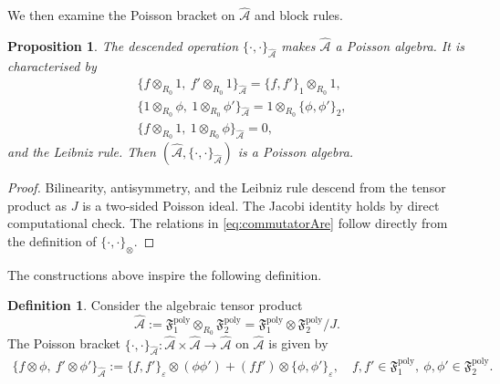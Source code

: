 \documentclass[11pt]{amsart}
\newtheorem{proposition}[theorem]{Proposition}
\theoremstyle{definition}
\newtheorem{definition}[theorem]{Definition}
\theoremstyle{plain}
\theoremstyle{conclusion}
\begin{document}
We then examine the Poisson bracket on $\widehat{\mathcal{A}}$ and block rules.

\begin{proposition} 
The descended operation $\{\cdot,\cdot\}_{\widehat{\mathcal{A}}}$ makes $\widehat{\mathcal{A}}$ a Poisson algebra. It is characterised by
\begin{align}
\nonumber
&\{f\otimes_{R_0} 1,\ f'\otimes_{R_0} 1\}_{\widehat{\mathcal{A}}} =\{f,f'\}_1\otimes_{R_0} 1,\\
&\{1\otimes_{R_0} \phi,\ 1\otimes_{R_0}\phi'\}_{\widehat{\mathcal{A}}} =1\otimes_{R_0}\{\phi,\phi'\}_2, \label{eq:commutatorAre}\\
\nonumber
&\{f\otimes_{R_0} 1,\ 1\otimes_{R_0}\phi\}_{\widehat{\mathcal{A}}}=0,
\end{align}
and the Leibniz rule.  Then $\left(\widehat{\mathcal{A}},\{\cdot ,\cdot \}_{\widehat{\mathcal{A}}}\right)$ is a Poisson algebra.
\end{proposition}

\begin{proof}
Bilinearity, antisymmetry, and the Leibniz rule descend from the tensor product as $J$ is a two-sided Poisson ideal. The Jacobi identity holds by direct computational check. The relations in \eqref{eq:commutatorAre} follow directly from the definition of $\{\cdot,\cdot\}_\otimes$.
\end{proof}
 
The constructions above inspire the following definition. 
 

\begin{definition}
\label{def:algetensorp}
  Consider the algebraic tensor product $$
\widehat{\mathcal{A}}:=\mathfrak{F}_1^{\mathrm{poly}}\otimes_{R_0}\mathfrak{F}_2^{\mathrm{poly}} = \mathfrak{F}_1^{\mathrm{poly}}\otimes \mathfrak{F}_2^{\mathrm{poly}}\big/J.
$$ The Poisson bracket $\{\cdot ,\cdot \}_{\widehat{\mathcal{A}}}:\widehat{\mathcal{A}}\times\widehat{\mathcal{A}}\to\widehat{\mathcal{A}}$ on $\widehat{\mathcal{A}}$ is given by \begin{align*}
    \{f\otimes\phi,\ f'\otimes\phi'\}_{\widehat{\mathcal{A}}} :=\{f,f'\}_\varepsilon\otimes(\phi\phi')+(ff')\otimes\{\phi,\phi'\}_\varepsilon, \quad f,f'\in \mathfrak{F}_1^{\mathrm{poly}},\ \phi,\phi'\in \mathfrak{F}_2^{\mathrm{poly}}.
\end{align*}   
\end{definition}
\end{document}
